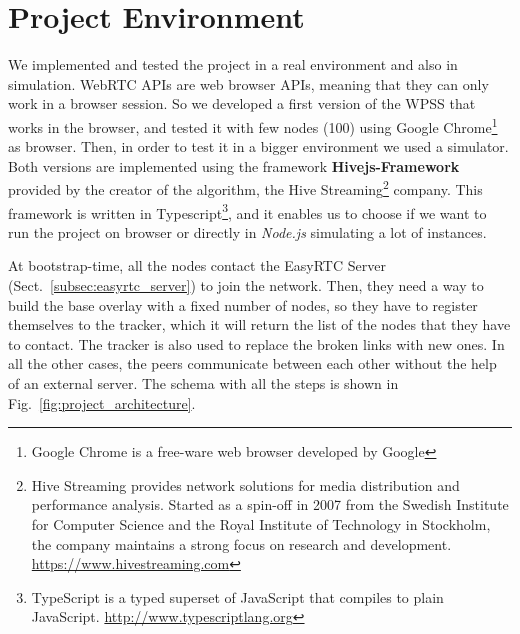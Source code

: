 \section{Project Environment}
\label{cha:design}
We implemented and tested the project in a real environment and also in simulation. WebRTC APIs are web browser APIs, meaning that they can only work in a browser session. So we developed a first version of the WPSS that works in the browser, and tested it with few nodes (100) using Google Chrome\footnote{Google Chrome is a free-ware web browser developed by Google} as browser. Then, in order to test it in a bigger environment we used a simulator. Both versions are implemented using the framework \textbf{Hivejs-Framework} provided by the creator of the algorithm, the Hive Streaming\footnote{Hive Streaming provides network solutions for media distribution and performance analysis. Started as a spin-off in 2007 from the Swedish Institute for Computer Science and the Royal Institute of Technology in Stockholm, the company maintains a strong focus on research and development. \url{https://www.hivestreaming.com}} company. This framework is written in Typescript\footnote{TypeScript is a typed superset of JavaScript that compiles to plain JavaScript. \url{http://www.typescriptlang.org}}, and it enables us to choose if we want to run the project on browser or directly in \textit{Node.js} simulating a lot of instances. 

At bootstrap-time, all the nodes contact the EasyRTC Server (Sect.~\ref{subsec:easyrtc_server}) to join the network. Then, they need a way to build the base overlay with a fixed number of nodes, so they have to register themselves to the tracker, which it will return the list of the nodes that they have to contact. The tracker is also used to replace the broken links with new ones. In all the other cases, the peers communicate between each other without the help of an external server. The schema with all the steps is shown in Fig.~\ref{fig:project_architecture}.

